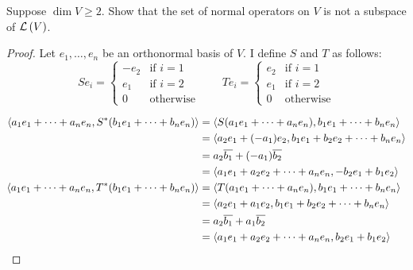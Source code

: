 \begin{exercise}
    Suppose $\dim V\geq 2$. Show that the set of normal operators on $V$ is not a subspace of $\mathcal{L}\left({V}\right)$.
\end{exercise}

\begin{proof}
    Let $e_{1}, \ldots, e_{n}$ be an orthonormal basis of $V$. I define $S$ and $T$ as follows:
    \[
        Se_{i} = \begin{cases}
            -e_{2} & \text{if $i = 1$} \\
            e_{1}  & \text{if $i = 2$} \\
            0      & \text{otherwise}
        \end{cases}\qquad
        Te_{i} = \begin{cases}
            e_{2} & \text{if $i = 1$} \\
            e_{1} & \text{if $i = 2$} \\
            0 & \text{otherwise}
        \end{cases}
    \]

    \begin{align*}
        \left\langle{a_{1}e_{1} + \cdots + a_{n}e_{n}, S^{*}(b_{1}e_{1} + \cdots + b_{n}e_{n})}\right\rangle & = \left\langle{S(a_{1}e_{1} + \cdots + a_{n}e_{n}), b_{1}e_{1} + \cdots + b_{n}e_{n}}\right\rangle \\
        & = \left\langle{a_{2}e_{1} + (-a_{1})e_{2}, b_{1}e_{1} + b_{2}e_{2} + \cdots + b_{n}e_{n}}\right\rangle \\
        & = a_{2}\overline{b_{1}} + (-a_{1})\overline{b_{2}} \\
        & = \left\langle{a_{1}e_{1} + a_{2}e_{2} + \cdots + a_{n}e_{n}, -b_{2}e_{1} + b_{1}e_{2}}\right\rangle \\
        \left\langle{a_{1}e_{1} + \cdots + a_{n}e_{n}, T^{*}(b_{1}e_{1} + \cdots + b_{n}e_{n})}\right\rangle & = \left\langle{T(a_{1}e_{1} + \cdots + a_{n}e_{n}), b_{1}e_{1} + \cdots + b_{n}e_{n}}\right\rangle \\
        & = \left\langle{a_{2}e_{1} + a_{1}e_{2}, b_{1}e_{1} + b_{2}e_{2} + \cdots + b_{n}e_{n}}\right\rangle \\
        & = a_{2}\overline{b_{1}} + a_{1}\overline{b_{2}} \\
        & = \left\langle{a_{1}e_{1} + a_{2}e_{2} + \cdots + a_{n}e_{n}, b_{2}e_{1} + b_{1}e_{2}}\right\rangle
    \end{align*}


\end{proof}
